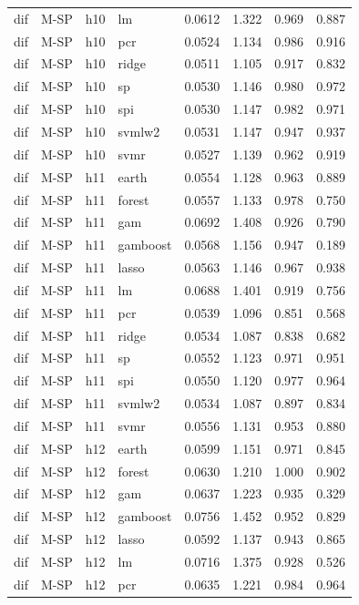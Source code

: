 \begin{ThreePartTable}
\begin{longtable}[t]{llclcccc}
dif & M-SP & h10 & lm & 0.0612 & 1.322 & 0.969 & 0.887\\
dif & M-SP & h10 & pcr & 0.0524 & 1.134 & 0.986 & 0.916\\
dif & M-SP & h10 & ridge & 0.0511 & 1.105 & 0.917 & 0.832\\
dif & M-SP & h10 & sp & 0.0530 & 1.146 & 0.980 & 0.972\\
dif & M-SP & h10 & spi & 0.0530 & 1.147 & 0.982 & 0.971\\
dif & M-SP & h10 & svmlw2 & 0.0531 & 1.147 & 0.947 & 0.937\\
dif & M-SP & h10 & svmr & 0.0527 & 1.139 & 0.962 & 0.919\\
\addlinespace
dif & M-SP & h11 & earth & 0.0554 & 1.128 & 0.963 & 0.889\\
dif & M-SP & h11 & forest & 0.0557 & 1.133 & 0.978 & 0.750\\
dif & M-SP & h11 & gam & 0.0692 & 1.408 & 0.926 & 0.790\\
dif & M-SP & h11 & gamboost & 0.0568 & 1.156 & 0.947 & 0.189\\
dif & M-SP & h11 & lasso & 0.0563 & 1.146 & 0.967 & 0.938\\
dif & M-SP & h11 & lm & 0.0688 & 1.401 & 0.919 & 0.756\\
dif & M-SP & h11 & pcr & 0.0539 & 1.096 & 0.851 & 0.568\\
dif & M-SP & h11 & ridge & 0.0534 & 1.087 & 0.838 & 0.682\\
dif & M-SP & h11 & sp & 0.0552 & 1.123 & 0.971 & 0.951\\
dif & M-SP & h11 & spi & 0.0550 & 1.120 & 0.977 & 0.964\\
dif & M-SP & h11 & svmlw2 & 0.0534 & 1.087 & 0.897 & 0.834\\
dif & M-SP & h11 & svmr & 0.0556 & 1.131 & 0.953 & 0.880\\
\addlinespace
dif & M-SP & h12 & earth & 0.0599 & 1.151 & 0.971 & 0.845\\
dif & M-SP & h12 & forest & 0.0630 & 1.210 & 1.000 & 0.902\\
dif & M-SP & h12 & gam & 0.0637 & 1.223 & 0.935 & 0.329\\
dif & M-SP & h12 & gamboost & 0.0756 & 1.452 & 0.952 & 0.829\\
dif & M-SP & h12 & lasso & 0.0592 & 1.137 & 0.943 & 0.865\\
dif & M-SP & h12 & lm & 0.0716 & 1.375 & 0.928 & 0.526\\
dif & M-SP & h12 & pcr & 0.0635 & 1.221 & 0.984 & 0.964\\

\end{longtable}
\end{ThreePartTable}
